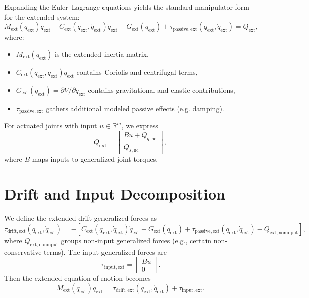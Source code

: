 \documentclass[12pt]{article}
\begin{document}
Expanding the Euler--Lagrange equations yields the standard manipulator form for the extended system:
\begin{equation}
M_{\mathrm{ext}}(q_{\mathrm{ext}})\ddot{q}_{\mathrm{ext}}
+
C_{\mathrm{ext}}(q_{\mathrm{ext}},\dot{q}_{\mathrm{ext}})\dot{q}_{\mathrm{ext}}
+
G_{\mathrm{ext}}(q_{\mathrm{ext}})
+
\tau_{\mathrm{passive,ext}}(q_{\mathrm{ext}},\dot{q}_{\mathrm{ext}})
=
Q_{\mathrm{ext}},
\end{equation}
where:
\begin{itemize}
\item $M_{\mathrm{ext}}(q_{\mathrm{ext}})$ is the extended inertia matrix,
\item $C_{\mathrm{ext}}(q_{\mathrm{ext}},\dot{q}_{\mathrm{ext}})\dot{q}_{\mathrm{ext}}$ contains Coriolis and centrifugal terms,
\item $G_{\mathrm{ext}}(q_{\mathrm{ext}}) = \partial V/\partial q_{\mathrm{ext}}$ contains gravitational and elastic contributions,
\item $\tau_{\mathrm{passive,ext}}$ gathers additional modeled passive effects (e.g. damping).
\end{itemize}

For actuated joints with input $u \in \mathbb{R}^m$, we express
\begin{equation}
Q_{\mathrm{ext}} =
\begin{bmatrix}
B u + Q_{q,\mathrm{nc}} \\
Q_{s,\mathrm{nc}}
\end{bmatrix},
\end{equation}
where $B$ maps inputs to generalized joint torques.

\section{Drift and Input Decomposition}

We define the extended drift generalized forces as
\begin{equation}
\tau_{\mathrm{drift,ext}}(q_{\mathrm{ext}},\dot{q}_{\mathrm{ext}})
=
- \left[
C_{\mathrm{ext}}(q_{\mathrm{ext}},\dot{q}_{\mathrm{ext}})\dot{q}_{\mathrm{ext}}
+ G_{\mathrm{ext}}(q_{\mathrm{ext}})
+ \tau_{\mathrm{passive,ext}}(q_{\mathrm{ext}},\dot{q}_{\mathrm{ext}})
- Q_{\mathrm{ext,noninput}}
\right],
\end{equation}
where $Q_{\mathrm{ext,noninput}}$ groups non-input generalized forces (e.g., certain non-conservative terms). The input generalized forces are
\begin{equation}
\tau_{\mathrm{input,ext}} = 
\begin{bmatrix}
B u \\ 0
\end{bmatrix}.
\end{equation}
Then the extended equation of motion becomes
\begin{equation}
M_{\mathrm{ext}}(q_{\mathrm{ext}})\ddot{q}_{\mathrm{ext}}
=
\tau_{\mathrm{drift,ext}}(q_{\mathrm{ext}},\dot{q}_{\mathrm{ext}})
+
\tau_{\mathrm{input,ext}}.
\end{equation}
\end{document}
